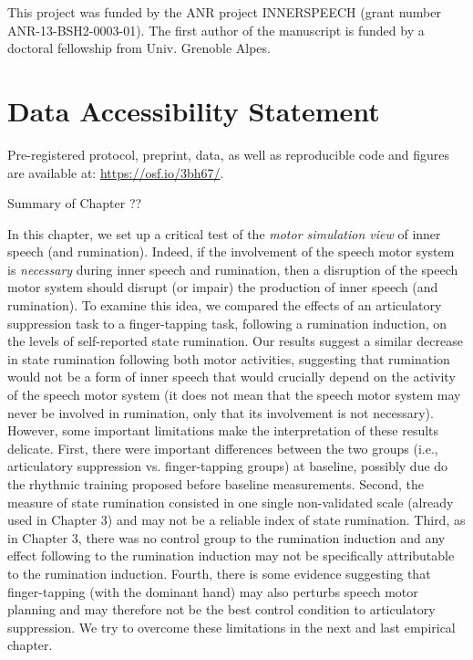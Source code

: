 \documentclass[a4paper,12pt,twoside,onecolumn,openright,final,oldfontcommands]{memoir}
\newcommand\getcurrentref[1]{
 \ifnumequal{\value{#1}}{0}
  {??}
  {\the\value{#1}}
}
\begin{document}
This project was funded by the ANR project INNERSPEECH (grant number ANR-13-BSH2-0003-01). The first author of the manuscript is funded by a doctoral fellowship from Univ. Grenoble Alpes.

\hypertarget{data-accessibility-statement}{%
\section{Data Accessibility Statement}\label{data-accessibility-statement}}

Pre-registered protocol, preprint, data, as well as reproducible code and figures are available at: \href{http://osf.io/3bh67}{https://osf.io/3bh67/}.

\newpage

\begin{vplace}[1]

\begin{summary}{Summary of Chapter\getcurrentref{chapter}}

In this chapter, we set up a critical test of the \textit{motor simulation view} of inner speech (and rumination). Indeed, if the involvement of the speech motor system is \textit{necessary} during inner speech and rumination, then a disruption of the speech motor system should disrupt (or impair) the production of inner speech (and rumination). To examine this idea, we compared the effects of an articulatory suppression task to a finger-tapping task, following a rumination induction, on the levels of self-reported state rumination. Our results suggest a similar decrease in state rumination following both motor activities, suggesting that rumination would not be a form of inner speech that would crucially depend on the activity of the speech motor system (it does not mean that the speech motor system may never be involved in rumination, only that its involvement is not necessary). However, some important limitations make the interpretation of these results delicate. First, there were important differences between the two groups (i.e., articulatory suppression vs. finger-tapping groups) at baseline, possibly due do the rhythmic training proposed before baseline measurements. Second, the measure of state rumination consisted in one single non-validated scale (already used in Chapter 3) and may not be a reliable index of state rumination. Third, as in Chapter 3, there was no control group to the rumination induction and any effect following to the rumination induction may not be specifically attributable to the rumination induction. Fourth, there is some evidence suggesting that finger-tapping (with the dominant hand) may also perturbs speech motor planning and may therefore not be the best control condition to articulatory suppression. We try to overcome these limitations in the next and last empirical chapter.

\end{summary}

\end{vplace}
\end{document}
